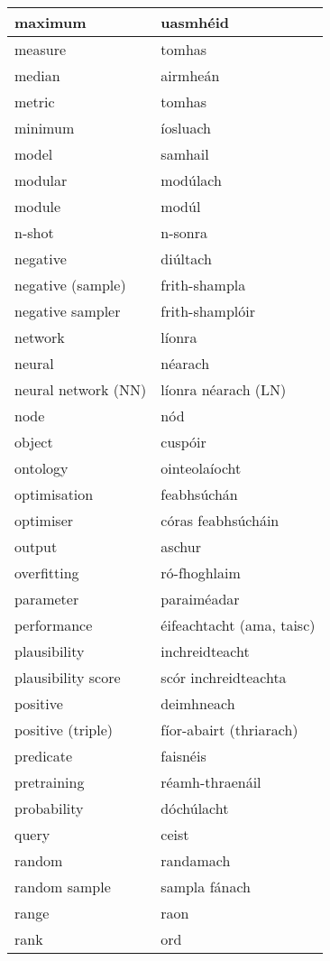 \documentclass{article}
\begin{document}
\begin{longtable}{|l|l|}
		maximum&uasmhéid\\ \hline 
		measure&tomhas\\ \hline 
		median&airmheán\\ \hline 
		metric&tomhas\\ \hline 
		minimum&íosluach\\ \hline 
		model&samhail\\ \hline 
		modular&modúlach\\ \hline 
		module&modúl\\ \hline 
		n-shot&n-sonra\\ \hline 
		negative&diúltach\\ \hline 
		negative (sample)&frith-shampla\\ \hline 
		negative sampler&frith-shamplóir\\ \hline 
		network&líonra\\ \hline 
		neural&néarach\\ \hline 
		neural network (NN)&líonra néarach (LN)\\ \hline 
		node&nód\\ \hline 
		object&cuspóir\\ \hline 
		ontology&ointeolaíocht\\ \hline 
		optimisation&feabhsúchán\\ \hline 
		optimiser&córas feabhsúcháin\\ \hline 
		output&aschur\\ \hline 
		overfitting&ró-fhoghlaim\\ \hline 
		parameter&paraiméadar\\ \hline 
		performance&éifeachtacht (ama, taisc)\\ \hline 
		plausibility&inchreidteacht\\ \hline 
		plausibility score&scór inchreidteachta\\ \hline 
		positive&deimhneach\\ \hline 
		positive (triple)&fíor-abairt (thriarach)\\ \hline 
		predicate&faisnéis\\ \hline 
		pretraining&réamh-thraenáil\\ \hline 
		probability&dóchúlacht\\ \hline 
		query&ceist\\ \hline 
		random&randamach\\ \hline 
		random sample&sampla fánach\\ \hline 
		range&raon\\ \hline 
		rank&ord\\ \hline 

\end{longtable}
\end{document}
